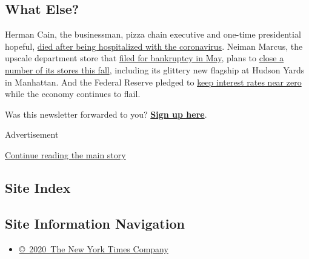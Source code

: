 \hypertarget{what-else}{%
\subsection{What Else?}\label{what-else}}

Herman Cain, the businessman, pizza chain executive and one-time
presidential hopeful,
\href{https://www.nytimes3xbfgragh.onion/2020/07/30/us/politics/herman-cain-dead.html}{died
after being hospitalized with the coronavirus}. Neiman Marcus, the
upscale department store that
\href{https://www.nytimes3xbfgragh.onion/2020/05/14/business/coronavirus-retail-bankruptcies-private-equity.html}{filed
for bankruptcy in May}, plans to
\href{https://www.nytimes3xbfgragh.onion/live/2020/07/24/business/stock-market-updates-coronavirus/neiman-marcus-will-close-its-store-in-new-yorks-hudson-yards}{close
a number of its stores this fall}, including its glittery new flagship
at Hudson Yards in Manhattan. And the Federal Reserve pledged to
\href{https://www.nytimes3xbfgragh.onion/2020/07/29/business/economy/federal-reserve-meeting-interest-rates.html}{keep
interest rates near zero} while the economy continues to flail.

Was this newsletter forwarded to you?
\textbf{\href{http://p.nytimes3xbfgragh.onion/email/re?location=pMJKdIFVI6pghfX2HXfSzxRpdoyDWYNW92ocucjMeAbbNVPsbJGn8R4fHWM9Sva4+RTqt8AQW7PP+ZPLEhuxT3YHWn3pZ0RzdMSPj9nIEbhGVypokOY2BkeLYa7jg3C32LlScbQnCqY=\&campaign_id=0\&instance_id=0\&segment_id=0\&user_id=b6f684c312bdf03b09c4c5a79e680ec1\&regi_id=020181026}{S}\href{https://www.nytimes3xbfgragh.onion/newsletters/with-interest}{ign
up here}}.

Advertisement

\protect\hyperlink{after-bottom}{Continue reading the main story}

\hypertarget{site-index}{%
\subsection{Site Index}\label{site-index}}

\hypertarget{site-information-navigation}{%
\subsection{Site Information
Navigation}\label{site-information-navigation}}

\begin{itemize}
\tightlist
\item
  \href{https://help.nytimes3xbfgragh.onion/hc/en-us/articles/115014792127-Copyright-notice}{©~2020~The
  New York Times Company}
\end{itemize}


